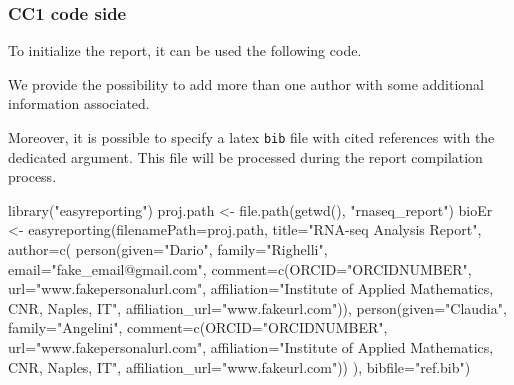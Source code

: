 \documentclass[
]{article}
\newenvironment{Shaded}{\begin{snugshade}}{\end{snugshade}}
\newcommand{\AttributeTok}[1]{\textcolor[rgb]{0.77,0.63,0.00}{#1}}
\newcommand{\FunctionTok}[1]{\textcolor[rgb]{0.00,0.00,0.00}{#1}}
\newcommand{\NormalTok}[1]{#1}
\newcommand{\OtherTok}[1]{\textcolor[rgb]{0.56,0.35,0.01}{#1}}
\newcommand{\StringTok}[1]{\textcolor[rgb]{0.31,0.60,0.02}{#1}}
\begin{document}
\hypertarget{cc1-code-side}{%
\subsubsection{CC1 code side}\label{cc1-code-side}}

To initialize the report, it can be used the following code.

We provide the possibility to add more than one author with some
additional information associated.

Moreover, it is possible to specify a latex \texttt{bib} file with cited
references with the dedicated argument. This file will be processed
during the report compilation process.

\begin{Shaded}
\begin{Highlighting}[]
\FunctionTok{library}\NormalTok{(}\StringTok{"easyreporting"}\NormalTok{)}
\NormalTok{proj.path }\OtherTok{\textless{}{-}} \FunctionTok{file.path}\NormalTok{(}\FunctionTok{getwd}\NormalTok{(), }\StringTok{"rnaseq\_report"}\NormalTok{)}
\NormalTok{bioEr }\OtherTok{\textless{}{-}} \FunctionTok{easyreporting}\NormalTok{(}\AttributeTok{filenamePath=}\NormalTok{proj.path, }\AttributeTok{title=}\StringTok{"RNA{-}seq Analysis Report"}\NormalTok{,}
                       \AttributeTok{author=}\FunctionTok{c}\NormalTok{(}
                           \FunctionTok{person}\NormalTok{(}\AttributeTok{given=}\StringTok{"Dario"}\NormalTok{, }\AttributeTok{family=}\StringTok{"Righelli"}\NormalTok{, }
                                  \AttributeTok{email=}\StringTok{"fake\_email@gmail.com"}\NormalTok{,}
                                  \AttributeTok{comment=}\FunctionTok{c}\NormalTok{(}\AttributeTok{ORCID=}\StringTok{"ORCIDNUMBER"}\NormalTok{, }
                                            \AttributeTok{url=}\StringTok{"www.fakepersonalurl.com"}\NormalTok{,}
                                            \AttributeTok{affiliation=}\StringTok{"Institute of Applied Mathematics, CNR, Naples, IT"}\NormalTok{, }
                                            \AttributeTok{affiliation\_url=}\StringTok{"www.fakeurl.com"}\NormalTok{)),}
                           \FunctionTok{person}\NormalTok{(}\AttributeTok{given=}\StringTok{"Claudia"}\NormalTok{, }\AttributeTok{family=}\StringTok{"Angelini"}\NormalTok{,}
                                  \AttributeTok{comment=}\FunctionTok{c}\NormalTok{(}\AttributeTok{ORCID=}\StringTok{"ORCIDNUMBER"}\NormalTok{,}
                                            \AttributeTok{url=}\StringTok{"www.fakepersonalurl.com"}\NormalTok{,}
                                            \AttributeTok{affiliation=}\StringTok{"Institute of Applied Mathematics, CNR, Naples, IT"}\NormalTok{,}
                                            \AttributeTok{affiliation\_url=}\StringTok{"www.fakeurl.com"}\NormalTok{))}
\NormalTok{                       ), }\AttributeTok{bibfile=}\StringTok{"ref.bib"}\NormalTok{)}
\end{Highlighting}
\end{Shaded}
\end{document}
